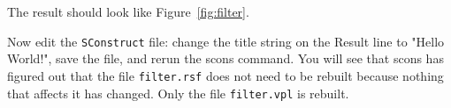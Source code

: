 
The result should look like Figure~\ref{fig:filter}.

Now edit the \texttt{SConstruct} file: change the title string on the Result line
to "Hello World!", save the file, and rerun the scons command. You will
see that scons has figured out that the file \texttt{filter.rsf} does not need to
be rebuilt because nothing that affects it has changed. Only the file
\texttt{filter.vpl} is rebuilt.

